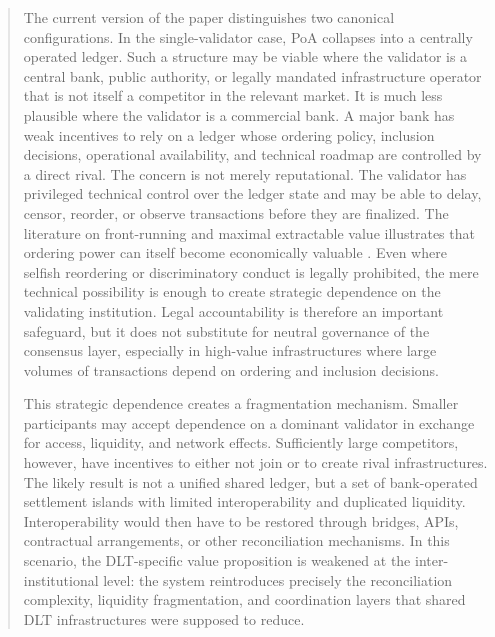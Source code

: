 \documentclass[
reprint,
showkeys,
superscriptaddress,
aps,
pra,
longbibliography,
nofootinbib
]{revtex4-2}
\begin{document}
\begin{abstract}
		The current version of the paper distinguishes two canonical configurations. In the single-validator case, PoA collapses into a centrally operated ledger.
		Such a structure may be viable where the validator is a central bank, public authority, or legally mandated infrastructure operator that is not itself a competitor in the relevant market. 
		It is much less plausible where the validator is a commercial bank. 
		A major bank has weak incentives to rely on a ledger whose ordering policy, inclusion decisions, operational availability, and technical roadmap are controlled by a direct rival. 
		The concern is not merely reputational. 
		The validator has privileged technical control over the ledger state and may be able to delay, censor, reorder, or observe transactions before they are finalized. 
		The literature on front-running and maximal extractable value illustrates that ordering power can itself become economically valuable \cite{daian2020flashboys,eskandari2019transparent}. 
		Even where selfish reordering or discriminatory conduct is legally prohibited, the mere technical possibility is enough to create strategic dependence on the validating institution. Legal accountability is therefore an important safeguard, but it does not substitute for neutral governance of the consensus layer, especially in high-value infrastructures where large volumes of transactions depend on ordering and inclusion decisions.
		
		This strategic dependence creates a fragmentation mechanism. 
		Smaller participants may accept dependence on a dominant validator in exchange for access, liquidity, and network effects. 
		Sufficiently large competitors, however, have incentives to either not join or to create rival infrastructures.
		The likely result is not a unified shared ledger, but a set of bank-operated settlement islands with limited interoperability and duplicated liquidity. Interoperability would then have to be restored through bridges, APIs, contractual arrangements, or other reconciliation mechanisms. 
		In this scenario, the DLT-specific value proposition is weakened at the inter-institutional level: the system reintroduces precisely the reconciliation complexity, liquidity fragmentation, and coordination layers that shared DLT infrastructures were supposed to reduce.
		

\end{abstract}
\end{document}
